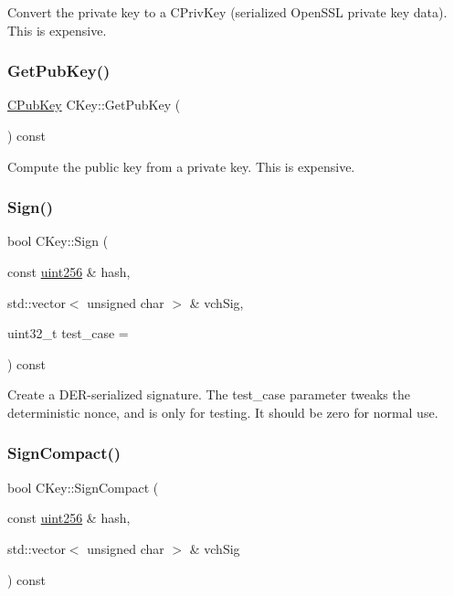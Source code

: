 Convert the private key to a C\+Priv\+Key (serialized Open\+S\+SL private key data). This is expensive. \mbox{\label{class_c_key_aa1085c59603a62db6ec776300f250337}} 
\subsubsection{\texorpdfstring{Get\+Pub\+Key()}{GetPubKey()}}
{\footnotesize\ttfamily \mbox{\hyperlink{class_c_pub_key}{C\+Pub\+Key}} C\+Key\+::\+Get\+Pub\+Key (\begin{DoxyParamCaption}{ }\end{DoxyParamCaption}) const}

Compute the public key from a private key. This is expensive. \mbox{\label{class_c_key_aa9b184a4a71d3e1a40aab360cf68e86c}} 
\subsubsection{\texorpdfstring{Sign()}{Sign()}}
{\footnotesize\ttfamily bool C\+Key\+::\+Sign (\begin{DoxyParamCaption}\item[{const \mbox{\hyperlink{classuint256}{uint256}} \&}]{hash,  }\item[{std\+::vector$<$ unsigned char $>$ \&}]{vch\+Sig,  }\item[{uint32\+\_\+t}]{test\+\_\+case = {} }\end{DoxyParamCaption}) const}

Create a D\+E\+R-\/serialized signature. The test\+\_\+case parameter tweaks the deterministic nonce, and is only for testing. It should be zero for normal use. \mbox{\label{class_c_key_afe77d80889aa68e92e6882e75424cfb8}} 
\subsubsection{\texorpdfstring{Sign\+Compact()}{SignCompact()}}
{\footnotesize\ttfamily bool C\+Key\+::\+Sign\+Compact (\begin{DoxyParamCaption}\item[{const \mbox{\hyperlink{classuint256}{uint256}} \&}]{hash,  }\item[{std\+::vector$<$ unsigned char $>$ \&}]{vch\+Sig }\end{DoxyParamCaption}) const}

